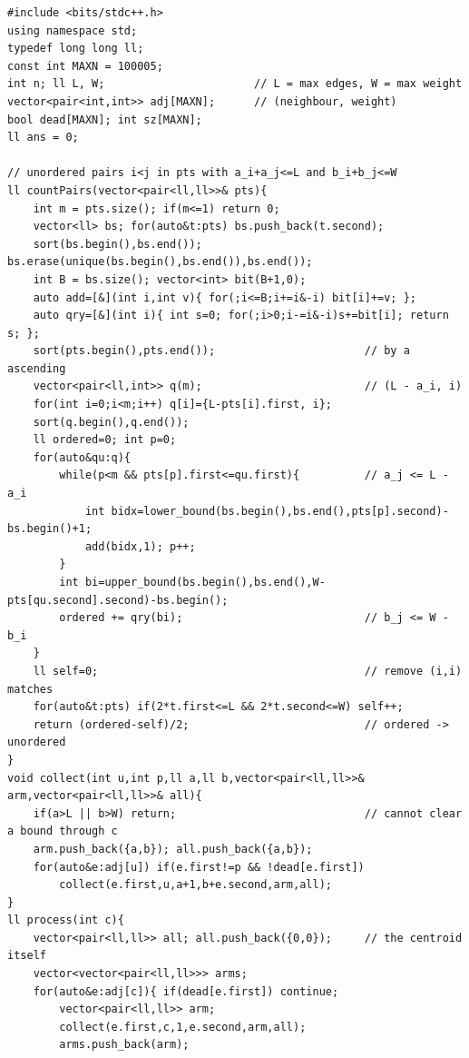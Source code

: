 \begin{lstlisting}[caption={CF 293E: count close pairs. At each centroid, build a per-node (edges, weight) table, count pairs clearing both budgets with a sort plus a Fenwick over compressed weights, and subtract the same-arm counts. dfs size and find centroid match lst:c18-build. ASCII only}, label={lst:c18-293e}]
#include <bits/stdc++.h>
using namespace std;
typedef long long ll;
const int MAXN = 100005;
int n; ll L, W;                       // L = max edges, W = max weight
vector<pair<int,int>> adj[MAXN];      // (neighbour, weight)
bool dead[MAXN]; int sz[MAXN];
ll ans = 0;

// unordered pairs i<j in pts with a_i+a_j<=L and b_i+b_j<=W
ll countPairs(vector<pair<ll,ll>>& pts){
    int m = pts.size(); if(m<=1) return 0;
    vector<ll> bs; for(auto&t:pts) bs.push_back(t.second);
    sort(bs.begin(),bs.end()); bs.erase(unique(bs.begin(),bs.end()),bs.end());
    int B = bs.size(); vector<int> bit(B+1,0);
    auto add=[&](int i,int v){ for(;i<=B;i+=i&-i) bit[i]+=v; };
    auto qry=[&](int i){ int s=0; for(;i>0;i-=i&-i)s+=bit[i]; return s; };
    sort(pts.begin(),pts.end());                       // by a ascending
    vector<pair<ll,int>> q(m);                         // (L - a_i, i)
    for(int i=0;i<m;i++) q[i]={L-pts[i].first, i};
    sort(q.begin(),q.end());
    ll ordered=0; int p=0;
    for(auto&qu:q){
        while(p<m && pts[p].first<=qu.first){          // a_j <= L - a_i
            int bidx=lower_bound(bs.begin(),bs.end(),pts[p].second)-bs.begin()+1;
            add(bidx,1); p++;
        }
        int bi=upper_bound(bs.begin(),bs.end(),W-pts[qu.second].second)-bs.begin();
        ordered += qry(bi);                            // b_j <= W - b_i
    }
    ll self=0;                                         // remove (i,i) matches
    for(auto&t:pts) if(2*t.first<=L && 2*t.second<=W) self++;
    return (ordered-self)/2;                           // ordered -> unordered
}
void collect(int u,int p,ll a,ll b,vector<pair<ll,ll>>& arm,vector<pair<ll,ll>>& all){
    if(a>L || b>W) return;                             // cannot clear a bound through c
    arm.push_back({a,b}); all.push_back({a,b});
    for(auto&e:adj[u]) if(e.first!=p && !dead[e.first])
        collect(e.first,u,a+1,b+e.second,arm,all);
}
ll process(int c){
    vector<pair<ll,ll>> all; all.push_back({0,0});     // the centroid itself
    vector<vector<pair<ll,ll>>> arms;
    for(auto&e:adj[c]){ if(dead[e.first]) continue;
        vector<pair<ll,ll>> arm;
        collect(e.first,c,1,e.second,arm,all);
        arms.push_back(arm);

\end{lstlisting}
